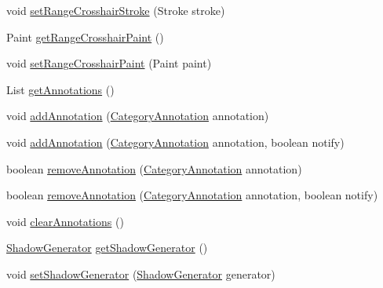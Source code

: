 \begin{DoxyCompactItemize}
\item 
void \mbox{\hyperlink{classorg_1_1jfree_1_1chart_1_1plot_1_1_category_plot_a10aa9ae7d091bb3c83d7634d1c9696c6}{set\+Range\+Crosshair\+Stroke}} (Stroke stroke)
\item 
Paint \mbox{\hyperlink{classorg_1_1jfree_1_1chart_1_1plot_1_1_category_plot_a765b9210a12e1f9374c252a5736a659a}{get\+Range\+Crosshair\+Paint}} ()
\item 
void \mbox{\hyperlink{classorg_1_1jfree_1_1chart_1_1plot_1_1_category_plot_abc74c7147d75331f023a571f8676e492}{set\+Range\+Crosshair\+Paint}} (Paint paint)
\item 
List \mbox{\hyperlink{classorg_1_1jfree_1_1chart_1_1plot_1_1_category_plot_a9fad81fe06afc8c95415bab459f204ee}{get\+Annotations}} ()
\item 
void \mbox{\hyperlink{classorg_1_1jfree_1_1chart_1_1plot_1_1_category_plot_a2d0e34330e6184b16926794c8f43bf3d}{add\+Annotation}} (\mbox{\hyperlink{interfaceorg_1_1jfree_1_1chart_1_1annotations_1_1_category_annotation}{Category\+Annotation}} annotation)
\item 
void \mbox{\hyperlink{classorg_1_1jfree_1_1chart_1_1plot_1_1_category_plot_aa0ee05b2249cff95e86359164fc0d732}{add\+Annotation}} (\mbox{\hyperlink{interfaceorg_1_1jfree_1_1chart_1_1annotations_1_1_category_annotation}{Category\+Annotation}} annotation, boolean notify)
\item 
boolean \mbox{\hyperlink{classorg_1_1jfree_1_1chart_1_1plot_1_1_category_plot_a5adf130fede1d1794996f5b3d5bf3974}{remove\+Annotation}} (\mbox{\hyperlink{interfaceorg_1_1jfree_1_1chart_1_1annotations_1_1_category_annotation}{Category\+Annotation}} annotation)
\item 
boolean \mbox{\hyperlink{classorg_1_1jfree_1_1chart_1_1plot_1_1_category_plot_a38dd23d3b64afd8fea74e11d2b53f5b6}{remove\+Annotation}} (\mbox{\hyperlink{interfaceorg_1_1jfree_1_1chart_1_1annotations_1_1_category_annotation}{Category\+Annotation}} annotation, boolean notify)
\item 
void \mbox{\hyperlink{classorg_1_1jfree_1_1chart_1_1plot_1_1_category_plot_af25bf2dbea35129a772698c95cd3d3c1}{clear\+Annotations}} ()
\item 
\mbox{\hyperlink{interfaceorg_1_1jfree_1_1chart_1_1util_1_1_shadow_generator}{Shadow\+Generator}} \mbox{\hyperlink{classorg_1_1jfree_1_1chart_1_1plot_1_1_category_plot_a41ee70d4c8b1cc8c54a4999d6191817c}{get\+Shadow\+Generator}} ()
\item 
void \mbox{\hyperlink{classorg_1_1jfree_1_1chart_1_1plot_1_1_category_plot_ac965167ef493598b809f6c6c12ccfd93}{set\+Shadow\+Generator}} (\mbox{\hyperlink{interfaceorg_1_1jfree_1_1chart_1_1util_1_1_shadow_generator}{Shadow\+Generator}} generator)

\end{DoxyCompactItemize}
